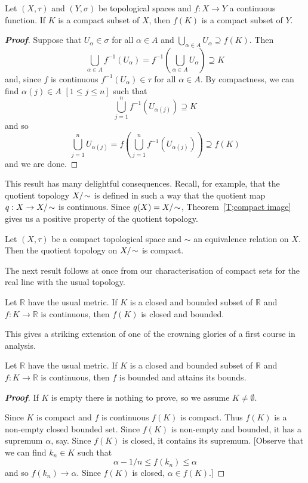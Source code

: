 \begin{theorem}\label{T;compact image} 
Let $(X,\tau)$ and $(Y,\sigma)$
be topological spaces and $f:X\rightarrow Y$ a continuous
function. If $K$ is a compact subset of $X$,
then $f(K)$ is a compact subset of $Y$.
\end{theorem}
\begin{proof}[\bf Proof] Suppose that $U_{\alpha}\in\sigma$ 
for all $\alpha\in A$
and $\bigcup_{\alpha\in A}U_{\alpha}\supseteq f(K)$.
Then
\[\bigcup_{\alpha\in A}f^{-1}(U_{\alpha})
=f^{-1}\left(\bigcup_{\alpha\in A}U_{\alpha}\right)\supseteq K\]
and, since $f$ is continuous $f^{-1}(U_{\alpha})\in\tau$
for all $\alpha\in A$. By compactness, we can find
$\alpha(j)\in A$ $[1\leq j\leq n]$ such that
\[\bigcup_{j=1}^{n}f^{-1}(U_{\alpha(j)})\supseteq K\]
and so
\[\bigcup_{j=1}^{n}U_{\alpha(j)}=
f\left(\bigcup_{j=1}^{n}f^{-1}(U_{\alpha(j)})\right)
\supseteq f(K)\]
and we are done.
\end{proof}


This result has many delightful consequences.
Recall, for example, that the quotient topology
$X/\negthinspace\sim$ is defined in such a way that the
quotient map $q:X\rightarrow X/\negthinspace\sim$ is continuous.
Since $q(X)=X/\negthinspace\sim$,
Theorem~\ref{T;compact image} gives us
a positive property of the quotient topology.


\begin{theorem}\label{T;quotient compact} 
Let $(X,\tau)$ be a compact topological space
and $\sim$ an equivalence relation on $X$.
Then the quotient topology on $X/\negthinspace\sim$ is compact.
\end{theorem}

The next result follows at once from our
characterisation of compact sets for the real
line with the usual topology.
\begin{theorem} 
Let ${\mathbb R}$ have the usual metric.
If $K$ is a closed and bounded subset of ${\mathbb R}$
and $f:K\rightarrow{\mathbb R}$ is continuous,
then $f(K)$ is closed and bounded.
\end{theorem}
This gives a striking extension of one of the
crowning glories of a first course in analysis.


\begin{theorem}\label{T;attains bounds} 
Let ${\mathbb R}$ have the usual metric.
If $K$ is a 
closed and bounded subset of ${\mathbb R}$
and $f:K\rightarrow{\mathbb R}$ is continuous,
then $f$ is bounded and attains its bounds.
\end{theorem}
\begin{proof}[\bf Proof] If $K$ is empty there is nothing to prove,
so we assume $K\neq\emptyset$.
 
Since $K$ is compact and $f$ is continuous
$f(K)$ is compact. Thus $f(K)$ is a non-empty closed
bounded set. Since $f(K)$ is non-empty and bounded,
it has a supremum $\alpha$, say. Since $f(K)$ is closed, 
it contains its supremum.
[Observe that we can find $k_{n}\in K$ such that
\[\alpha-1/n\leq f(k_{n})\leq \alpha\]
and so $f(k_{n})\rightarrow\alpha$. Since $f(K)$
is closed, $\alpha\in f(K)$.]
\end{proof}



